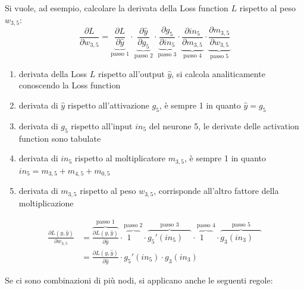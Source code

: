 \begin{center}
\begin{minipage}{0.45\textwidth}
	\end{minipage}
	\hfill
	\begin{minipage}{0.54\textwidth}
			Si vuole, ad esempio, calcolare la derivata della Loss function \(L\) rispetto al peso \(w_{3,5}\):
			\[\frac{\partial L}{\partial w_{3,5}} = \underbrace{\frac{\partial L}{\partial \hat{y}}}_{\text{passo 1}} \cdot \underbrace{\frac{\partial \hat{y}}{\partial g_5}}_{\text{passo 2}} \cdot \underbrace{\frac{\partial g_5}{\partial in_5}}_{\text{passo 3}} \cdot \underbrace{\frac{\partial in_5}{\partial m_{3,5}}}_{\text{passo 4}} \cdot \underbrace{\frac{\partial m_{3,5}}{\partial w_{3,5}}}_{\text{passo 5}}\]
			\begin{enumerate}
				\item derivata della Loss \(L\) rispetto all'output \(\hat{y}\), si calcola analiticamente conoscendo la Loss function
				\item derivata di \(\hat{y}\) rispetto all'attivazione \(g_5\), è sempre 1 in quanto \(\hat{y} = g_5\)
				\item derivata di \(g_5\) rispetto all'input \(in_5\) del neurone 5, le derivate delle activation function sono tabulate
				\item derivata di \(in_5\) rispetto al moltiplicatore \(m_{3,5}\), è sempre 1 in quanto \(in_5 = m_{3,5} + m_{4,5} + m_{0,5}\)
				\item derivata di \(m_{3,5}\) rispetto al peso \(w_{3,5}\), corrisponde all'altro fattore della moltiplicazione
			\end{enumerate}
			\begin{align*}
				\frac{\partial L(y, \hat{y})}{\partial w_{3,5}} &= \overbrace{\frac{\partial L(y, \hat{y})}{\partial \hat{y}}}^{\text{passo 1}} \cdot \overbrace{1\!\!\!\!\!\!\phantom{\int}}^{\text{passo 2}} \cdot \overbrace{g_5'(in_5)\!\!\!\!\!\!\phantom{\int}}^{\text{passo 3}} \cdot \overbrace{1\!\!\!\!\!\!\phantom{\int}}^{\text{passo 4}} \cdot \overbrace{g_3(in_3)\!\!\!\!\!\!\phantom{\int}}^{\text{passo 5}} \\[5pt]
				&= \frac{\partial L(y, \hat{y})}{\partial \hat{y}} \cdot g_5'(in_5) \cdot g_3(in_3)
			\end{align*}
	\end{minipage}
\end{center}
Se ci sono combinazioni di più nodi, si applicano anche le seguenti regole:
